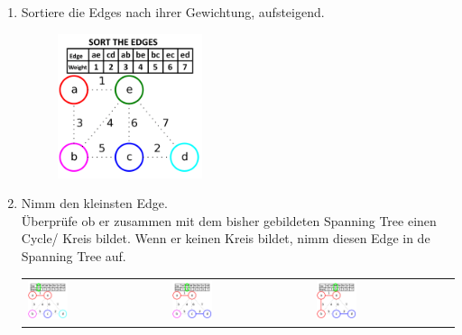 \documentclass[a4paper,10pt]{report}
\begin{document}
\begin{enumerate}	
	\item
		Sortiere die Edges nach ihrer Gewichtung, aufsteigend.
		\begin{figure}[H]
			\begin{center}
  				\includegraphics[width=0.4\textwidth]{img/kruskal2.png}
			\end{center}
		\end{figure}
	\newpage
	\item
		Nimm den kleinsten Edge. \\
		Überprüfe ob er zusammen mit dem bisher gebildeten Spanning Tree einen Cycle/ Kreis bildet. Wenn er keinen Kreis bildet, nimm diesen Edge in de Spanning Tree auf.\\
		\begin{tabularx}{\textwidth}{XXX}	
  			\includegraphics[width=0.3\textwidth]{img/kruskal3_1.png}
			&
  			\includegraphics[width=0.3\textwidth]{img/kruskal3_2.png}
			&
  			\includegraphics[width=0.3\textwidth]{img/kruskal3_3.png}

\end{tabularx}
\end{enumerate}
\end{document}
